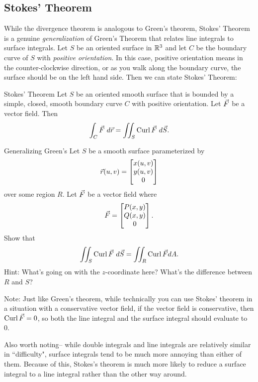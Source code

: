 \subsection{Stokes' Theorem}
While the divergence theorem is analogous to Green's theorem, Stokes' Theorem is a genuine \textit{generalization} of Green's Theorem that relates line integrals to surface integrals. Let $S$ be an oriented surface in $\mathbb{R}^3$ and let $C$ be the boundary curve of $S$ with \textit{positive orientation}. In this case, positive orientation means in the counter-clockwise direction, or as you walk along the boundary curve, the surface should be on the left hand side. Then we can state Stokes' Theorem:

\begin{theorem}{Stokes' Theorem}
Let $S$ be an oriented smooth surface that is bounded by a simple, closed, smooth boundary curve $C$ with positive orientation. Let $\vec{F}$ be a vector field. Then $$\int_C\vcF \ d\vcr=\iint_S\curl\vcF\ d\vcS.$$
\end{theorem}

\begin{exercise}{Generalizing Green's}
Let $S$ be a smooth surface parameterized by $$\vec{r}(u,v)=\begin{bmatrix}x(u,v)\\y(u,v)\\0\end{bmatrix} $$ over some region $R$. Let $\vec{F}$ be a vector field where $$\vec{F}=\begin{bmatrix}P(x,y)\\Q(x,y)\\0\end{bmatrix}.$$ Show that $$\iint_S \curl\vcF \ d\vcS=\iint_R\curl\vcF dA.$$ Hint: What's going on with the $z$-coordinate here? What's the difference between $R$ and $S$?
\end{exercise}

Note: Just like Green's theorem, while technically you can use Stokes' theorem in a situation with a conservative vector field, if the vector field is conservative, then $\operatorname{Curl}\vec{F}=0$, so both the line integral and the surface integral should evaluate to 0.

Also worth noting-- while double integrals and line integrals are relatively similar in ``difficulty", surface integrals tend to be much more annoying than either of them. Because of this, Stokes's theorem is much more likely to reduce a surface integral to a line integral rather than the other way around.

